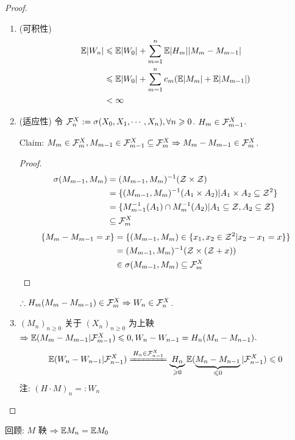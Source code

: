 \begin{proof}
    \begin{enumerate}
        \item (可积性)
        \[
        \begin{aligned}
            \mathbb E |W_n| &\leqslant \mathbb E |W_0|+\sum_{m=1}^n \mathbb E |H_m||M_m-M_{m-1}|\\
            &\leqslant \mathbb E |W_0|+\sum_{m=1}^n c_m (\mathbb E |M_m|+ \mathbb E |M_{m-1}|)\\
            &<\infty
        \end{aligned}
        \]
        \item (适应性) 令 $\mathcal{F}_n^X:=\sigma(X_0,X_1,\cdots,X_n), \forall n\geqslant 0$. $H_m\in \mathcal{F}_{m-1}^X$.
        
        Claim: $M_m\in \mathcal{F}_m^X, M_{m-1}\in \mathcal{F}_{m-1}^X\subseteq \mathcal{F}_m^X \Rightarrow M_m-M_{m-1}\in \mathcal{F}_m^X$.
        \begin{proof}
        \[
        \begin{aligned}
            \sigma(M_{m-1},M_m) &=(M_{m-1}, M_m)^{-1}(\mathcal{Z}\times \mathcal{Z})\\
            &=\{(M_{m-1}, M_m)^{-1}(A_1\times A_2)|A_1\times A_2\subseteq \mathcal{Z}^2\}\\
            &=\{M_{m-1}^{-1}(A_1)\cap M_m^{-1}(A_2)|A_1\subseteq \mathcal{Z}, A_2\subseteq \mathcal{Z}\}\\
            &\subseteq \mathcal{F}_m^X
        \end{aligned}
        \]
        \[
        \begin{aligned}
            \{M_m-M_{m-1}=x\} &=\{(M_{m-1}, M_m)\in \{x_1,x_2\in \mathcal{Z}^2|x_2-x_1=x\}\}\\
            &=(M_{m-1}, M_m)^{-1}(\mathcal{Z}\times (\mathcal{Z}+x))\\
            &\in \sigma(M_{m-1}, M_m)\subseteq \mathcal{F}_m^X
        \end{aligned}
        \]
        \end{proof}
        $\therefore H_m(M_m-M_{m-1})\in \mathcal{F}_m^X \Rightarrow W_n\in \mathcal{F}_n^X$.
        \item $(M_n)_{n\geq 0}$ 关于 $(X_n)_{n\geq 0}$ 为上鞅 $\Rightarrow \mathbb E(M_m-M_{m-1}|\mathcal{F}_{m-1}^X)\leqslant 0, W_n-W_{n-1}=H_n(M_n-M_{n-1})$.
        \[
        \EE(W_n-W_{n-1}|\CF_{n-1}^X)\xlongequal{H_n\in \CF_{n-1}^X}\underbrace{H_n}_{\geq 0}\EE(\underbrace{M_n-M_{n-1}}_{\leq 0}|\CF_{n-1}^X)\leq 0
        \]
        注: $(H\cdot M)_n=:W_n$
    \end{enumerate}
\end{proof}

回顾: $M$ 鞅 $\Rightarrow \mathbb E M_n=\mathbb E M_0$

